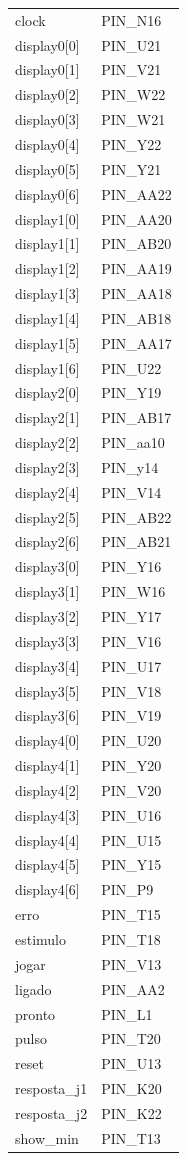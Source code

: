 \documentclass[12pt,a4paper]{article}
\begin{document}
\begin{longtable}{ll}
clock         & PIN\_N16 \\
display0[0]   & PIN\_U21 \\
display0[1]   & PIN\_V21 \\
display0[2]   & PIN\_W22 \\
display0[3]   & PIN\_W21 \\
display0[4]   & PIN\_Y22 \\
display0[5]   & PIN\_Y21 \\
display0[6]   & PIN\_AA22 \\
display1[0]   & PIN\_AA20 \\
display1[1]   & PIN\_AB20 \\
display1[2]   & PIN\_AA19 \\
display1[3]   & PIN\_AA18 \\
display1[4]   & PIN\_AB18 \\
display1[5]   & PIN\_AA17 \\
display1[6]   & PIN\_U22 \\
display2[0]   & PIN\_Y19 \\
display2[1]   & PIN\_AB17 \\
display2[2]   & PIN\_aa10 \\
display2[3]   & PIN\_y14 \\
display2[4]   & PIN\_V14 \\
display2[5]   & PIN\_AB22 \\
display2[6]   & PIN\_AB21 \\
display3[0]   & PIN\_Y16 \\
display3[1]   & PIN\_W16 \\
display3[2]   & PIN\_Y17 \\
display3[3]   & PIN\_V16 \\
display3[4]   & PIN\_U17 \\
display3[5]   & PIN\_V18 \\
display3[6]   & PIN\_V19 \\
display4[0]   & PIN\_U20 \\
display4[1]   & PIN\_Y20 \\
display4[2]   & PIN\_V20 \\
display4[3]   & PIN\_U16 \\
display4[4]   & PIN\_U15 \\
display4[5]   & PIN\_Y15 \\
display4[6]   & PIN\_P9 \\
erro          & PIN\_T15 \\
estimulo      & PIN\_T18 \\
jogar         & PIN\_V13 \\
ligado        & PIN\_AA2 \\
pronto        & PIN\_L1 \\
pulso         & PIN\_T20 \\
reset         & PIN\_U13 \\
resposta\_j1  & PIN\_K20 \\
resposta\_j2  & PIN\_K22 \\
show\_min     & PIN\_T13 \\

\end{longtable}
\end{document}
